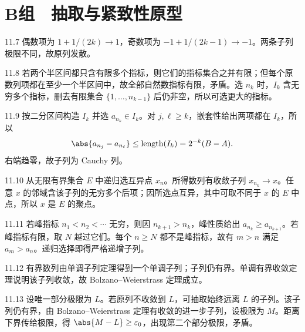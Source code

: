 \section*{B组　抽取与紧致性原型}

\begin{solution}{11.7}
偶数项为 \(1+1/(2k)\to1\)，奇数项为
\(-1+1/(2k-1)\to-1\)。两条子列极限不同，故原列发散。
\end{solution}

\begin{solution}{11.8}
若两个半区间都只含有限多个指标，则它们的指标集合之并有限；但每个原数列项都在至少一个半区间中，故全部自然数指标有限，矛盾。选 \(n_k\) 时，\(I_k\) 含无穷多个指标，删去有限集合 \(\{1,\ldots,n_{k-1}\}\) 后仍非空，所以可选更大的指标。
\end{solution}

\begin{solution}{11.9}
按二分区间构造 \(I_k\) 并选 \(a_{n_k}\in I_k\)。对 \(j,\ell\ge k\)，嵌套性给出两项都在 \(I_k\)，所以
\[
 \abs{a_{n_j}-a_{n_\ell}}
 \le\operatorname{length}(I_k)=2^{-k}(B-A).
\]
右端趋零，故子列为 Cauchy 列。
\end{solution}

\begin{solution}{11.10}
从无限有界集合 \(E\) 中递归选互异点 \(x_n\)。所得数列有收敛子列
\(x_{n_k}\to x\)。任意 \(x\) 的邻域含该子列的无穷多个后项；因所选点互异，其中可取不同于 \(x\) 的 \(E\) 中点，所以 \(x\) 是 \(E\) 的聚点。
\end{solution}

\begin{solution}{11.11}
若峰指标 \(n_1<n_2<\cdots\) 无穷，则因 \(n_{k+1}>n_k\)，峰性质给出
\(a_{n_k}\ge a_{n_{k+1}}\)。若峰指标有限，取 \(N\) 越过它们。每个 \(n\ge N\) 都不是峰指标，故有 \(m>n\) 满足 \(a_m>a_n\)。递归选择即得严格递增子列。
\end{solution}

\begin{solution}{11.12}
有界数列由单调子列定理得到一个单调子列；子列仍有界。单调有界收敛定理说明该子列收敛，故 Bolzano--Weierstrass 定理成立。
\end{solution}

\begin{solution}{11.13}
设唯一部分极限为 \(L\)。若原列不收敛到 \(L\)，可抽取始终远离 \(L\) 的子列。该子列仍有界，由 Bolzano--Weierstrass 定理有收敛的进一步子列，设极限为 \(M\)。距离下界传给极限，得 \(\abs{M-L}\ge\varepsilon_0\)，出现第二个部分极限，矛盾。
\end{solution}

